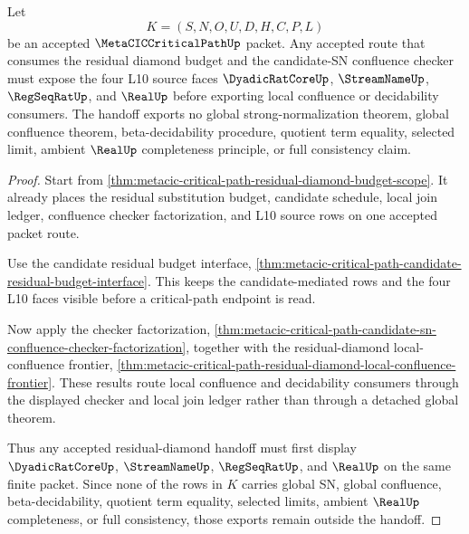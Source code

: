 \begin{theorem}
\label{thm:metacic-critical-path-candidate-mediated-residual-diamond-l10-handoff}
Let
$$
K=(S,N,O,U,D,H,C,P,L)
$$
be an accepted $\MetaCICCriticalPathUp$ packet. Any accepted route that consumes the residual diamond budget and the candidate-SN confluence checker must expose the four L10 source faces $\DyadicRatCoreUp$, $\StreamNameUp$, $\RegSeqRatUp$, and $\RealUp$ before exporting local confluence or decidability consumers. The handoff exports no global strong-normalization theorem, global confluence theorem, beta-decidability procedure, quotient term equality, selected limit, ambient $\RealUp$ completeness principle, or full consistency claim.
\end{theorem}
\begin{proof}
Start from \autoref{thm:metacic-critical-path-residual-diamond-budget-scope}. It already places the residual substitution budget, candidate schedule, local join ledger, confluence checker factorization, and L10 source rows on one accepted packet route.

Use the candidate residual budget interface, \autoref{thm:metacic-critical-path-candidate-residual-budget-interface}. This keeps the candidate-mediated rows and the four L10 faces visible before a critical-path endpoint is read.

Now apply the checker factorization, \autoref{thm:metacic-critical-path-candidate-sn-confluence-checker-factorization}, together with the residual-diamond local-confluence frontier, \autoref{thm:metacic-critical-path-residual-diamond-local-confluence-frontier}. These results route local confluence and decidability consumers through the displayed checker and local join ledger rather than through a detached global theorem.

Thus any accepted residual-diamond handoff must first display $\DyadicRatCoreUp$, $\StreamNameUp$, $\RegSeqRatUp$, and $\RealUp$ on the same finite packet. Since none of the rows in $K$ carries global SN, global confluence, beta-decidability, quotient term equality, selected limits, ambient $\RealUp$ completeness, or full consistency, those exports remain outside the handoff.
\end{proof}

